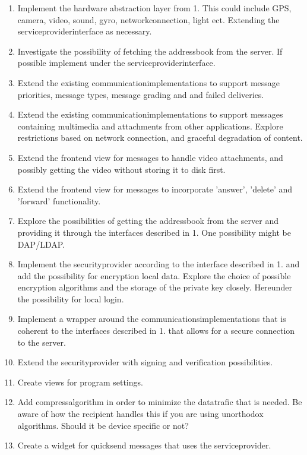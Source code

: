 \documentclass[a4paper, norsk, 12pt]{article}
\begin{document}
\begin{enumerate}
			\item Implement the hardware abstraction layer from 1. 
				This could include GPS, camera, video, sound, gyro, networkconnection, light ect. Extending the serviceproviderinterface as necessary.
				
			\item Investigate the possibility of fetching the addressbook from the server. 
				If possible implement under the serviceproviderinterface.
				
			\item Extend the existing communicationimplementations to support message priorities, message types, message grading and and failed deliveries.
			
			\item Extend the existing communicationimplementations to support messages containing multimedia and attachments from other applications.
				Explore restrictions based on network connection, and graceful degradation of content. 
			
			\item Extend the frontend view for messages to handle video attachments, and possibly getting the video without storing it to disk first.	
			
			\item Extend the frontend view for messages to incorporate 'answer', 'delete' and 'forward' functionality.
			
			\item Explore the possibilities of getting the addressbook from the server and providing it through the interfaces described in 1.
				One possibility might be DAP/LDAP.
			
			\item Implement the securityprovider according to the interface described in 1. and add the possibility for encryption local data.
				Explore the choice of possible encryption algorithms and the storage of the private key closely. Hereunder the possibility for local login.
			
			\item Implement a wrapper around the communicationsimplementations that is coherent to the interfaces described in 1. that allows for a secure connection to the server.
			
			\item Extend the securityprovider with signing and verification possibilities.
			
			\item Create views for program settings.
			
			\item Add compressalgorithm in order to minimize the datatrafic that is needed.
				Be aware of how the recipient handles this if you are using unorthodox algorithms. Should it be device specific or not?
			
			\item Create a widget for quicksend messages that uses the serviceprovider.
		\end{enumerate}
	\pagebreak
\end{document}
